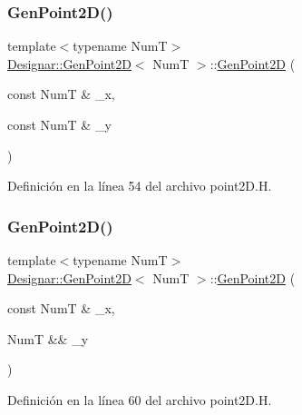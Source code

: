 \subsubsection{\texorpdfstring{Gen\+Point2\+D()}{GenPoint2D()}\hspace{0.1cm}{\footnotesize\ttfamily [2/7]}}
{\footnotesize\ttfamily template$<$typename NumT$>$ \\
\hyperlink{class_designar_1_1_gen_point2_d}{Designar\+::\+Gen\+Point2D}$<$ NumT $>$\+::\hyperlink{class_designar_1_1_gen_point2_d}{Gen\+Point2D} (\begin{DoxyParamCaption}\item[{const NumT \&}]{\+\_\+x,  }\item[{const NumT \&}]{\+\_\+y }\end{DoxyParamCaption})\hspace{0.3cm}{\ttfamily [inline]}}



Definición en la línea 54 del archivo point2\+D.\+H.

\mbox{\label{class_designar_1_1_gen_point2_d_a7e3357422dc01310240f58fed213162d}} 
\subsubsection{\texorpdfstring{Gen\+Point2\+D()}{GenPoint2D()}\hspace{0.1cm}{\footnotesize\ttfamily [3/7]}}
{\footnotesize\ttfamily template$<$typename NumT$>$ \\
\hyperlink{class_designar_1_1_gen_point2_d}{Designar\+::\+Gen\+Point2D}$<$ NumT $>$\+::\hyperlink{class_designar_1_1_gen_point2_d}{Gen\+Point2D} (\begin{DoxyParamCaption}\item[{const NumT \&}]{\+\_\+x,  }\item[{NumT \&\&}]{\+\_\+y }\end{DoxyParamCaption})\hspace{0.3cm}{\ttfamily [inline]}}



Definición en la línea 60 del archivo point2\+D.\+H.

\mbox{\label{class_designar_1_1_gen_point2_d_ab4e177989279ac6e6f7280644f487cdd}} 
